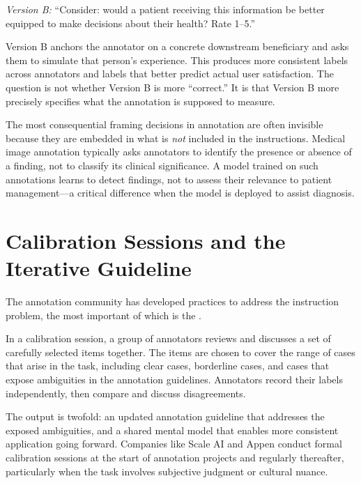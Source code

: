 \begin{center}
\textit{Version B:} ``Consider: would a patient receiving this information be better equipped to make decisions about their health? Rate 1--5.''
\end{center}

Version B anchors the annotator on a concrete downstream beneficiary and asks them to simulate that person's experience. This produces more consistent labels across annotators and labels that better predict actual user satisfaction. The question is not whether Version B is more ``correct.'' It is that Version B more precisely specifies what the annotation is supposed to measure.

The most consequential framing decisions in annotation are often invisible because they are embedded in what is \emph{not} included in the instructions. Medical image annotation typically asks annotators to identify the presence or absence of a finding, not to classify its clinical significance. A model trained on such annotations learns to detect findings, not to assess their relevance to patient management---a critical difference when the model is deployed to assist diagnosis.

\section{Calibration Sessions and the Iterative Guideline}
\label{sec:ch7-calibration}

The annotation community has developed practices to address the instruction problem, the most important of which is the .

In a calibration session, a group of annotators reviews and discusses a set of carefully selected items together. The items are chosen to cover the range of cases that arise in the task, including clear cases, borderline cases, and cases that expose ambiguities in the annotation guidelines. Annotators record their labels independently, then compare and discuss disagreements.

The output is twofold: an updated annotation guideline that addresses the exposed ambiguities, and a shared mental model that enables more consistent application going forward. Companies like Scale AI and Appen conduct formal calibration sessions at the start of annotation projects and regularly thereafter, particularly when the task involves subjective judgment or cultural nuance.

